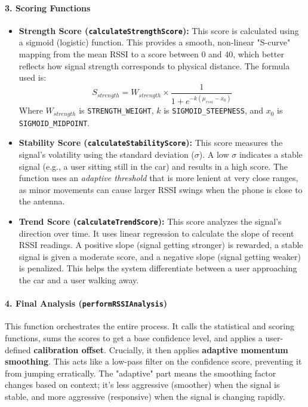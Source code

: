 \documentclass{article}
\begin{document}
\paragraph{3. Scoring Functions}
\begin{itemize}
    \item \textbf{Strength Score (\texttt{calculateStrengthScore}):} This score is calculated using a sigmoid (logistic) function. This provides a smooth, non-linear "S-curve" mapping from the mean RSSI to a score between 0 and 40, which better reflects how signal strength corresponds to physical distance.
    The formula used is:
    $$S_{strength} = W_{strength} \times \frac{1}{1 + e^{-k(\mu_{rssi} - x_0)}}$$
    Where $W_{strength}$ is \texttt{STRENGTH\_WEIGHT}, $k$ is \texttt{SIGMOID\_STEEPNESS}, and $x_0$ is \texttt{SIGMOID\_MIDPOINT}.
    
    \item \textbf{Stability Score (\texttt{calculateStabilityScore}):} This score measures the signal's volatility using the standard deviation ($\sigma$). A low $\sigma$ indicates a stable signal (e.g., a user sitting still in the car) and results in a high score. The function uses an \textit{adaptive threshold} that is more lenient at very close ranges, as minor movements can cause larger RSSI swings when the phone is close to the antenna.
    
    \item \textbf{Trend Score (\texttt{calculateTrendScore}):} This score analyzes the signal's direction over time. It uses linear regression to calculate the slope of recent RSSI readings. A positive slope (signal getting stronger) is rewarded, a stable signal is given a moderate score, and a negative slope (signal getting weaker) is penalized. This helps the system differentiate between a user approaching the car and a user walking away.
\end{itemize}

\paragraph{4. Final Analysis (\texttt{performRSSIAnalysis})}
This function orchestrates the entire process. It calls the statistical and scoring functions, sums the scores to get a base confidence level, and applies a user-defined \textbf{calibration offset}.
Crucially, it then applies \textbf{adaptive momentum smoothing}. This acts like a low-pass filter on the confidence score, preventing it from jumping erratically. The "adaptive" part means the smoothing factor changes based on context; it's less aggressive (smoother) when the signal is stable, and more aggressive (responsive) when the signal is changing rapidly.
\end{document}
